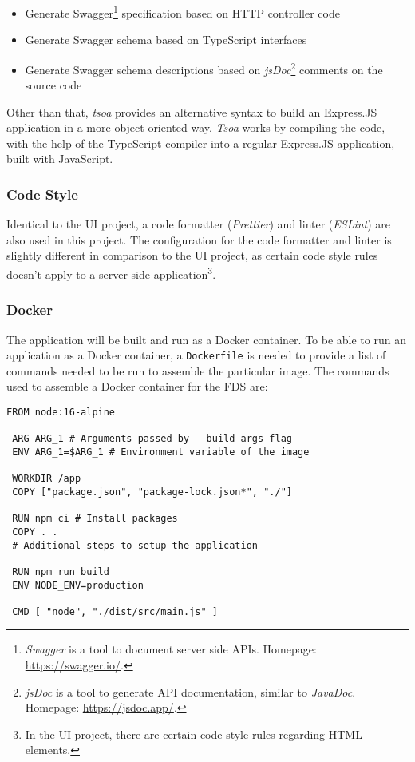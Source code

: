    \begin{itemize}
    \item Generate Swagger\footnote{\emph{Swagger} is a tool to document server side APIs. Homepage: \url{https://swagger.io/}.} specification based on HTTP controller code
    \item Generate Swagger schema based on TypeScript interfaces
    \item Generate Swagger schema descriptions based on \emph{jsDoc}\footnote{\emph{jsDoc} is a tool to generate API documentation, similar to \emph{JavaDoc}. Homepage: \url{https://jsdoc.app/}.} comments on the source code
   \end{itemize}
  
  Other than that, \emph{tsoa} provides an alternative syntax to build an Express.JS application in a more object-oriented way. \emph{Tsoa} works by compiling the code, with the help of the TypeScript compiler into a regular Express.JS application, built with JavaScript. 

  \subsubsection{Code Style}
  Identical to the UI project, a code formatter (\emph{Prettier}) and linter (\emph{ESLint}) are also used in this project. The configuration for the code formatter and linter is slightly different in comparison to the UI project, as certain code style rules doesn't apply to a server side application\footnote{In the UI project, there are certain code style rules regarding HTML elements.}.

  \subsubsection{Docker}
  The application will be built and run as a Docker container. To be able to run an application as a Docker container, a \verb;Dockerfile; is needed to provide a list of commands needed to be run to assemble the particular image. The commands used to assemble a Docker container for the FDS are:

   \begin{lstlisting}[caption={Dockerfile for FDS (Docker)}, language=docker]
 FROM node:16-alpine

 ARG ARG_1 # Arguments passed by --build-args flag
 ENV ARG_1=$ARG_1 # Environment variable of the image

 WORKDIR /app
 COPY ["package.json", "package-lock.json*", "./"]

 RUN npm ci # Install packages
 COPY . .
 # Additional steps to setup the application

 RUN npm run build
 ENV NODE_ENV=production

 CMD [ "node", "./dist/src/main.js" ]
   \end{lstlisting}
  
